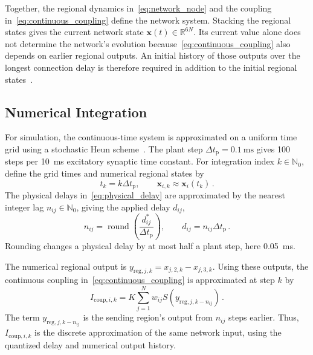 Together, the regional dynamics in~\eqref{eq:network_node} and the coupling in~\eqref{eq:continuous_coupling} define the network system.
Stacking the regional states gives the current network state $\mathbf{x}(t)\in\mathbb{R}^{6N}$.
Its current value alone does not determine the network's evolution because~\eqref{eq:continuous_coupling} also depends on earlier regional outputs.
An initial history of those outputs over the longest connection delay is therefore required in addition to the initial regional states~\cite{SanzLeon2015}.

\subsection{Numerical Integration}

For simulation, the continuous-time system is approximated on a uniform time grid using a stochastic Heun scheme~\cite{SanzLeon2015}.
The plant step $\Delta t_\mathrm{p}=\SI{0.1}{\milli\second}$ gives 100 steps per \SI{10}{\milli\second} excitatory synaptic time constant. %
For integration index $k\in\mathbb{N}_0$, define the grid times and numerical regional states by
%
\begin{equation}
    t_k=k\Delta t_\mathrm{p},
    \qquad \mathbf{x}_{i,k}\approx\mathbf{x}_i(t_k)\,.
\end{equation}
%
The physical delays in~\eqref{eq:physical_delay} are approximated by the nearest integer lag $n_{ij}\in\mathbb{N}_0$, giving the applied delay $d_{ij}$,
%
\begin{equation}
    n_{ij}=\operatorname{round}\!\left(\frac{d_{ij}^{\ast}}{\Delta t_\mathrm{p}}\right),
    \qquad
    d_{ij}=n_{ij}\Delta t_\mathrm{p}\,.
    \label{eq:delay_quantisation}
\end{equation}
%
Rounding changes a physical delay by at most half a plant step, here \SI{0.05}{\milli\second}.

The numerical regional output is \mbox{$y_{\mathrm{reg},j,k}=x_{j,2,k}-x_{j,3,k}$}.
Using these outputs, the continuous coupling in~\eqref{eq:continuous_coupling} is approximated at step $k$ by
%
\begin{equation*}
    I_{\mathrm{coup},i,k}
    =K\sum_{j=1}^{N}w_{ij}
      S\!\left(y_{\mathrm{reg},j,k-n_{ij}}\right)\,.
\end{equation*}
%
The term $y_{\mathrm{reg},j,k-n_{ij}}$ is the sending region's output from $n_{ij}$ steps earlier.
Thus, $I_{\mathrm{coup},i,k}$ is the discrete approximation of the same network input, using the quantized delay and numerical output history.

